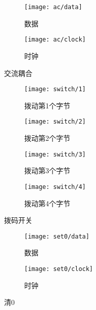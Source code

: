 \documentclass[../main]{subfiles}
\begin{document}
\begin{figure}[htbp]
  \centering
  \begin{subfigure}[htbp]{0.45\linewidth}
    \centering
    \texttt{[image: ac/data]}
    \caption{数据}%
    \label{fig:ac/data}
  \end{subfigure}
  \quad
  \begin{subfigure}[htbp]{0.45\linewidth}
    \centering
    \texttt{[image: ac/clock]}
    \caption{时钟}%
    \label{fig:ac/clock}
  \end{subfigure}
  \caption{交流耦合}%
  \label{fig:ac}
\end{figure}

\begin{figure}[htbp]
  \centering
  \begin{subfigure}[htbp]{0.45\linewidth}
    \centering
    \texttt{[image: switch/1]}
    \caption{拨动第1个字节}%
    \label{fig:switch/1}
  \end{subfigure}
  \quad
  \begin{subfigure}[htbp]{0.45\linewidth}
    \centering
    \texttt{[image: switch/2]}
    \caption{拨动第2个字节}%
    \label{fig:switch/2}
  \end{subfigure}

  \begin{subfigure}[htbp]{0.45\linewidth}
    \centering
    \texttt{[image: switch/3]}
    \caption{拨动第3个字节}%
    \label{fig:switch/3}
  \end{subfigure}
  \quad
  \begin{subfigure}[htbp]{0.45\linewidth}
    \centering
    \texttt{[image: switch/4]}
    \caption{拨动第4个字节}%
    \label{fig:switch/4}
  \end{subfigure}
  \caption{拨码开关}%
  \label{fig:switch}
\end{figure}

\begin{figure}[htbp]
  \centering
  \begin{subfigure}[htbp]{0.45\linewidth}
    \centering
    \texttt{[image: set0/data]}
    \caption{数据}%
    \label{fig:set0/data}
  \end{subfigure}
  \quad
  \begin{subfigure}[htbp]{0.45\linewidth}
    \centering
    \texttt{[image: set0/clock]}
    \caption{时钟}%
    \label{fig:set0/clock}
  \end{subfigure}
  \caption{清0}%
  \label{fig:set0}
\end{figure}
\end{document}
